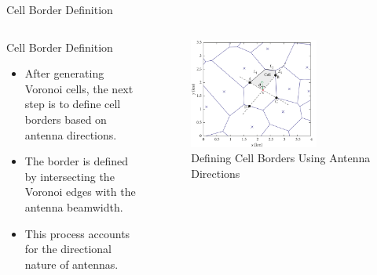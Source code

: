 \begin{frame}{Cell Border Definition}
    \begin{columns}
        \begin{column}{0.4\textwidth}
            \begin{block}{Cell Border Definition}
                    \begin{itemize}
                        \item After generating Voronoi cells, the next step is to define cell borders based on antenna directions.
                        \item The border is defined by intersecting the Voronoi edges with the antenna beamwidth.
                        \item This process accounts for the directional nature of antennas.
                    \end{itemize}
            \end{block}
        \end{column}
        \begin{column}{0.6\textwidth}
            \begin{figure}
                \includegraphics[width=0.7\textwidth]{images/Altair/Voronoi_appr/Cell_border.png}  %
                \caption{Defining Cell Borders Using Antenna Directions}
            \end{figure}
        \end{column}
    \end{columns}
\end{frame}



